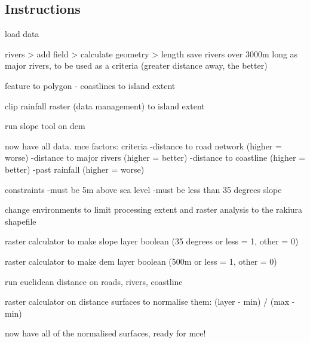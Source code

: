 \documentclass{article}
\begin{document}
\subsection{Instructions}


load data

rivers > add field > calculate geometry > length
save rivers over 3000m long as major rivers, to be used as a criteria (greater distance away, the better)

feature to polygon - coastlines to island extent

clip rainfall raster (data management) to island extent

run slope tool on dem

now have all data. mce factors:
criteria
-distance to road network (higher = worse)
-distance to major rivers (higher = better)
-distance to coastline (higher = better)
-past rainfall (higher = worse)

constraints
-must be 5m above sea level
-must be less than 35 degrees slope

change environments to limit processing extent and raster analysis to the rakiura shapefile

raster calculator to make slope layer boolean (35 degrees or less = 1, other = 0)

raster calculator to make dem layer boolean (500m or less = 1, other = 0)

run euclidean distance on roads, rivers, coastline

raster calculator on distance surfaces to normalise them: (layer - min) / (max - min)

now have all of the normalised surfaces, ready for mce!
\end{document}
